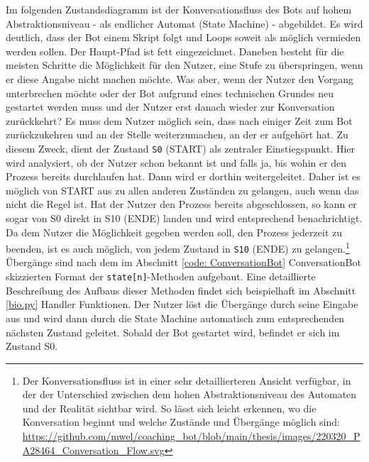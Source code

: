 	Im folgenden Zustandsdiagramm ist der Konversationsfluss des Bots auf hohem Abstraktionsniveau - als endlicher Automat (State Machine) - abgebildet. Es wird deutlich, dass der Bot einem Skript folgt und Loops soweit als möglich vermieden werden sollen. Der Haupt-Pfad ist fett eingezeichnet. Daneben besteht für die meisten Schritte die Möglichkeit für den Nutzer, eine Stufe zu überspringen, wenn er diese Angabe nicht machen möchte. Was aber, wenn der Nutzer den Vorgang unterbrechen möchte oder der Bot aufgrund eines technischen Grundes neu gestartet werden muss und der Nutzer erst danach wieder zur Konversation zurückkehrt? Es muss dem Nutzer möglich sein, dass nach einiger Zeit zum Bot zurückzukehren und an der Stelle weiterzumachen, an der er aufgehört hat. Zu diesem Zweck, dient der Zustand \verb|S0| (START) als zentraler Einstiegspunkt. Hier wird analysiert, ob der Nutzer schon bekannt ist und falls ja, bis wohin er den Prozess bereits durchlaufen hat. Dann wird er dorthin weitergeleitet. Daher ist es möglich von START aus zu allen anderen Zuständen zu gelangen, auch wenn das nicht die Regel ist. Hat der Nutzer den Prozess bereits abgeschlossen, so kann er sogar von S0 direkt in S10 (ENDE) landen und wird entsprechend benachrichtigt. Da dem Nutzer die Möglichkeit gegeben werden soll, den Prozess jederzeit zu beenden, ist es auch möglich, von jedem Zustand in \verb|S10| (ENDE) zu gelangen.\footnote{Der Konversationsfluss ist in einer sehr detaillierteren Ansicht verfügbar, in der der Unterschied zwischen dem hohen Abstraktionsniveau des Automaten und der Realität sichtbar wird. So lässt sich leicht erkennen, wo die Konversation beginnt und welche Zustände und Übergänge möglich sind: \url{https://github.com/mwel/coaching_bot/blob/main/thesis/images/220320_PA28464_Conversation_Flow.svg}} Übergänge sind nach dem im Abschnitt \ref{code: ConversationBot} ConversationBot skizzierten Format der \verb|state[n]|-Methoden aufgebaut. Eine detaillierte Beschreibung des Aufbaus dieser Methoden findet sich beispielhaft im Abschnitt \ref*{bio.py} Handler Funktionen. Der Nutzer löst die Übergänge durch seine Eingabe aus und wird dann durch die State Machine automatisch zum entsprechenden nächsten Zustand geleitet.
	Sobald der Bot gestartet wird, befindet er sich im Zustand S0.
